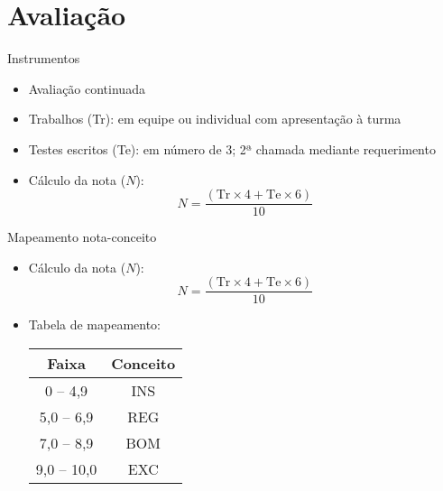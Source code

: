    \section[ slide = false ]{Avaliação}
      \begin{slide}[toc=]{Instrumentos}
         \begin{itemize}
            \item Avaliação continuada
            \item Trabalhos (Tr): em equipe ou individual com apresentação à turma
            \item Testes escritos (Te): em número de 3; 2ª chamada mediante requerimento
            \item Cálculo da nota ($N$):
            \begin{equation*}
               N=\frac{( \text{Tr} \times 4 + \text{Te} \times 6 )} {10}
            \end{equation*}
          \end{itemize}
      \end{slide}
      
      \begin{slide}[toc=]{Mapeamento nota-conceito}
         \begin{itemize}
            \item Cálculo da nota ($N$): 
            \begin{equation*}
               N=\frac{( \text{Tr} \times 4 + \text{Te} \times 6 )} {10}
            \end{equation*}
            \item Tabela de mapeamento:
            \begin{table}
               \centering
               \begin{tabular}{c|c}
                  \hline\hline
                  \textbf{Faixa} & \textbf{Conceito}\\
                  \hline
                  0 -- 4,9 & INS\\
                  5,0 -- 6,9 & REG\\
                  7,0 -- 8,9 & BOM\\
                  9,0 -- 10,0 & EXC\\
                  \hline\hline
               \end{tabular}
            \end{table}    
         \end{itemize}
      \end{slide}
      
